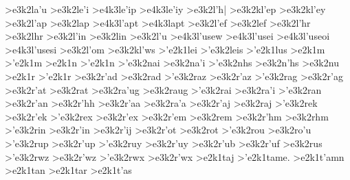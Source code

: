 {	>e3k2la'u   		%
	>e3k2le'i		%
		>e4k3le'ip		%
		>e4k3le'iy		%
	>e3k2l'h|		%
	>e3k2kl'ep		%
	>e3k2kl'ey		%
	>e3k2l'ap   		%
	>e3k2lap		%
		>e4k3l'apt  		%
		>e4k3lapt
	>e3k2l'ef		%
	>e3k2lef		%
	>e3k2l'hr		%
	>e3k2lhr 		%
	>e3k2l'in		%
	>e3k2lin		%
	>e3k2l'u		%
		>e4k3l'usew		%
		>e4k3l'usei
		>e4k3l'useoi
		>e4k3l'usesi
	>e3k2l'om   		%
	>e3k2kl'ws		%
>'e2k1lei       		%
	>'e3k2leis		%
>'e2k1lus	       		%
>e2k1m
>'e2k1m
>e2k1n
>'e2k1n
	>'e3k2nai		%
	>e3k2na'i		%
	>'e3k2nhs		%
	>e3k2n'hs		%
	>e3k2nu    		%
>e2k1r
>'e2k1r
	>e3k2r'ad		%
	>e3k2rad
	>'e3k2raz		%
	>e3k2r'az
	>'e3k2rag		%
	>e3k2r'ag
	>e3k2r'at		%
	>e3k2rat
	>e3k2ra'ug		%
	>e3k2raug
	>'e3k2rai		%
	>e3k2ra'i
	>'e3k2ran		%
	>e3k2r'an
	>e3k2r'hh		%
	>e3k2r'aa
	>e3k2ra'a
	>e3k2r'aj  		%
	>e3k2raj
	>'e3k2rek		%
	>e3k2r'ek
	>'e3k2rex 		%
	>e3k2r'ex 
	>e3k2r'em		%
	>e3k2rem
	>e3k2r'hm		%
	>e3k2rhm
	>'e3k2rin		%
	>e3k2r'in
	>e3k2r'ij
	>e3k2r'ot		%
	>e3k2rot
	>'e3k2rou		%
	>e3k2ro'u
	>'e3k2rup  		%
	>e3k2r'up 		%
	>'e3k2ruy
	>e3k2r'uy
	>e3k2r'ub
	>e3k2r'uf
	>e3k2rus  		%
	>'e3k2rwz  		%
	>e3k2r'wz
	>'e3k2rwx  		%
	>e3k2r'wx
>e2k1taj  		%
>'e2k1tame. 		%
>e2k1t'amn  		%
>e2k1tan    		%
>e2k1tar   		%
>e2k1t'as   		%
}
